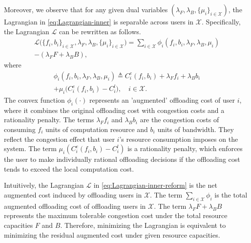 \documentclass[lettersize,journal]{IEEEtran}
\begin{document}
Moreover, we observe that for any given dual variables $(\lambda_F,\lambda_B,\{\mu_i\}_{i\in\mathcal{X}})$, the Lagrangian in \eqref{eq:Lagrangian-inner} is separable across users in $\mathcal{X}$. 
Specifically, the Lagrangian $\mathcal{L}$ can be rewritten as follows.
\begin{equation}\label{eq:Lagrangian-inner-reform}
    \begin{split}
        \mathcal{L}\big(\{f_i,b_i\}_{i\in \mathcal{X}},\lambda_F,\lambda_B,\{\mu_i\}_{i\in \mathcal{X}}\big)=\sum_{i\in \mathcal{X}} \phi_i(f_i, b_i,\lambda_F,\lambda_B,\mu_i)\\
  - (\lambda_F F + \lambda_B B),
    \end{split}
\end{equation}
where
\begin{equation}
\begin{split}
        \phi_i(f_i,b_i,\lambda_F,\lambda_B,\mu_i)
\triangleq 
 C_i^e(f_i,b_i)
       + \lambda_F f_i
       + \lambda_B b_i \\
       + \mu_i \big(C^e_i(f_i,b_i)-C_i^l\big), \quad i\in\mathcal{X}. \label{eq:local-value-function}
\end{split}
\end{equation}
The convex function $\phi_i(\cdot)$ represents an 'augmented' offloading cost of user $i$, where it combines the original offloading cost with congestion costs and a rationality penalty. The terms $\lambda_Ff_i$ and $\lambda_Bb_i$ are the congestion costs of consuming $f_i$ units of computation resource and $b_i$ units of bandwidth. They reflect the congestion effect that user $i$'s resource consumption imposes on the system. The term $\mu_i(C^e_i(f_i,b_i)-C_i^l)$ is a rationality penalty, which enforces the user to make individually rational offloading decisions if the offloading cost tends to exceed the local computation cost.

Intuitively, the Lagrangian $\mathcal{L}$ in \eqref{eq:Lagrangian-inner-reform} is the net augmented cost induced by offloading users in $\mathcal{X}$. The term $\sum_{i\in\mathcal{X}}\phi_i$ is the total augmented offloading cost of offloading users in $\mathcal{X}$. The term $\lambda_FF+\lambda_BB$ represents the maximum tolerable congestion cost under the total resource capacities $F$ and $B$. Therefore, minimizing the Lagrangian is equivalent to minimizing the residual augmented cost under given resource capacities.
\end{document}

